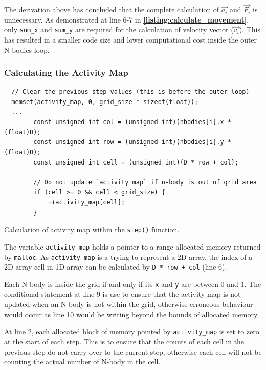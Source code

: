 \documentclass[12pt, a4paper]{article}
\let\oldcref\cref
\renewcommand{\cref}[1]{\textbf{\oldcref{#1}}}
\begin{document}
The derivation above has concluded that the complete calculation of \(\vec{a_i}\) and \(\vec{F_i}\)
is unnecessary. As demonstrated at line 6-7 in \cref{listing:calculate_movement}, only
\texttt{sum\_x} and \texttt{sum\_y} are required for the calculation of velocity vector
(\(\vec{v_i}\)). This has resulted in a smaller code size and lower computational cost inside the
outer N-bodies loop.

\subsubsection{Calculating the Activity Map} \label{subsec:calculate_activity_map}
\begin{listing}[ht]
  \begin{verbatim}
  // Clear the previous step values (this is before the outer loop)
  memset(activity_map, 0, grid_size * sizeof(float));
  ...
        const unsigned int col = (unsigned int)(nbodies[i].x * (float)D);
        const unsigned int row = (unsigned int)(nbodies[i].y * (float)D);
        const unsigned int cell = (unsigned int)(D * row + col);

        // Do not update `activity_map` if n-body is out of grid area
        if (cell >= 0 && cell < grid_size) {
            ++activity_map[cell];
        }
  \end{verbatim}
  \caption{Calculation of activity map within the \texttt{step()} function.}
  \label{listing:calculate_activity_map}
\end{listing}

The variable \texttt{activity\_map} holds a pointer to a range allocated memory returned by
\texttt{malloc}. As \texttt{activity\_map} is a trying to represent a 2D array, the index of a 2D
array cell in 1D array can be calculated by \texttt{D * row + col} (line 6).

Each N-body is inside the grid if and only if its \texttt{x} and \texttt{y} are between 0 and 1. The
conditional statement at line 9 is use to ensure that the activity map is not updated when an N-body
is not within the grid, otherwise erroneous behaviour would occur as line 10 would be writing beyond
the bounds of allocated memory.

At line 2, each allocated block of memory pointed by \texttt{activity\_map} is set to zero at the
start of each step. This is to ensure that the counts of each cell in the previous step do not carry
over to the current step, otherwise each cell will not be counting the actual number of N-body in
the cell.
\end{document}
